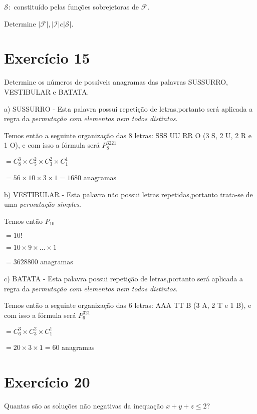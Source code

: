 \documentclass[12pt]{article}
\begin{document}
$\mathcal{S}:$ constituído pelas funções sobrejetoras de $\mathcal{F}$.

Determine $|\mathcal{F}|, |\mathcal{I}| e |\mathcal{S}|$.

\section*{Exercício 15}

Determine os números de possíveis anagramas das palavras SUSSURRO, VESTIBULAR e BATATA.

\bigskip

a) SUSSURRO - Esta palavra possui repetição de letras,portanto será aplicada a regra da \textit{permutação com elementos nem todos distintos}.

Temos então a seguinte organização das 8 letras: SSS UU RR O (3 S, 2 U, 2 R e 1 O), e com isso a fórmula será $\displaystyle P_{8}^{3221} $

$= C_8^3 \times C_5^2 \times C_3^2 \times C_1^1$

$=56 \times 10 \times 3 \times 1 = 1680$ anagramas

\bigskip

b) VESTIBULAR - Esta palavra não possui letras repetidas,portanto trata-se de uma \textit{permutação simples}.

Temos então $P_{10}$

$= 10!$

$= 10 \times 9 \times ... \times 1$

$= 3628800$ anagramas

\bigskip

c) BATATA - Esta palavra possui repetição de letras,portanto será aplicada a regra da \textit{permutação com elementos nem todos distintos}.

Temos então a seguinte organização das 6 letras: AAA TT B (3 A, 2 T e 1 B), e com isso a fórmula será $\displaystyle P_{6}^{321} $

$= C_6^3 \times C_3^2 \times C_1^1$

$= 20 \times 3 \times 1 = 60$ anagramas

\section*{Exercício 20}

Quantas são as soluções não negativas da inequação $x + y + z \leq 2$?
\end{document}
